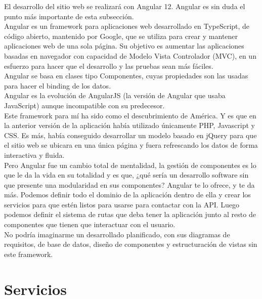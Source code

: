 El desarrollo del sitio web se realizará con Angular 12. Angular es sin duda el punto más importante de esta subsección.
\\Angular es un framework para aplicaciones web desarrollado en TypeScript, de código abierto, mantenido por Google, que se utiliza para crear y mantener aplicaciones web de una sola página. Su objetivo es aumentar las aplicaciones basadas en navegador con capacidad de Modelo Vista Controlador (MVC), en un esfuerzo para hacer que el desarrollo y las pruebas sean más fáciles.
\\Angular se basa en clases tipo Componentes, cuyas propiedades son las usadas para hacer el binding de los datos.
\\Angular es la evolución de AngularJS (la versión de Angular que usaba JavaScript) aunque incompatible con su predecesor.
\\Este framework para mí ha sido como el descubrimiento de América. Y es que en la anterior versión de la aplicación había utilizado únicamente PHP, Javascript y CSS. Es más, había conseguido desarrollar un modelo basado en jQuery para que el sitio web se ubicara en una única página y fuera refrescando los datos de forma interactiva y fluida. 
\\Pero Angular fue un cambio total de mentalidad, la gestión de componentes es lo que le da la vida en su totalidad y es que, ¿qué sería un desarrollo software sin que presente una modularidad en sus componentes? Angular te lo ofrece, y te da más. Podemos definir todo el dominio de la aplicación dentro de ella y crear los servicios para que estén listos para usarse para contactar con la API. Luego podemos definir el sistema de rutas que deba tener la aplicación junto al resto de componentes que tienen que interactuar con el usuario.
\\No podría imaginarme un desarrollado planificado, con sus diagramas de requisitos, de base de datos, diseño de componentes y estructuración de vistas sin este framework.

\section{Servicios}

